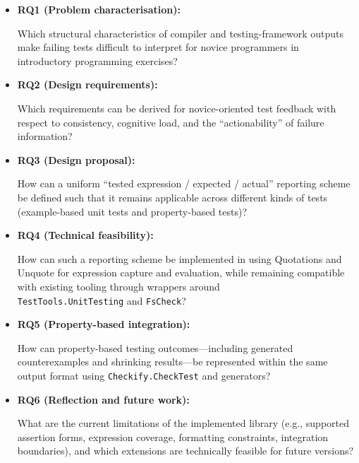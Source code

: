 \begin{itemize}
    \item \textbf{RQ1 (Problem characterisation):}
        \begin{justify}Which structural characteristics of compiler and testing-framework outputs make failing tests difficult to interpret for novice programmers in introductory programming exercises?\end{justify}
    \item \textbf{RQ2 (Design requirements):}
        \begin{justify}Which requirements can be derived for novice-oriented test feedback with respect to consistency, cognitive load, and the ``actionability'' of failure information?\end{justify}
    \item \textbf{RQ3 (Design proposal):}
        \begin{justify}How can a uniform ``tested expression / expected / actual'' reporting scheme be defined such that it remains applicable across different kinds of tests (example-based unit tests and property-based tests)?\end{justify}
    \item \textbf{RQ4 (Technical feasibility):}
        \begin{justify}How can such a reporting scheme be implemented in \fs{} using Quotations and Unquote for expression capture and evaluation, while remaining compatible with existing tooling through wrappers around\\\texttt{TestTools.UnitTesting} and \texttt{FsCheck}?\end{justify}
    \item \textbf{RQ5 (Property-based integration):}
        \begin{justify}How can property-based testing outcomes---including generated counterexamples and shrinking results---be represented within the same output format using \texttt{Checkify.CheckTest} and generators?\end{justify}
    \item \textbf{RQ6 (Reflection and future work):}
        \begin{justify}What are the current limitations of the implemented library (e.g., supported assertion forms, expression coverage, formatting constraints, integration boundaries), and which extensions are technically feasible for future versions?\end{justify}
\end{itemize}

